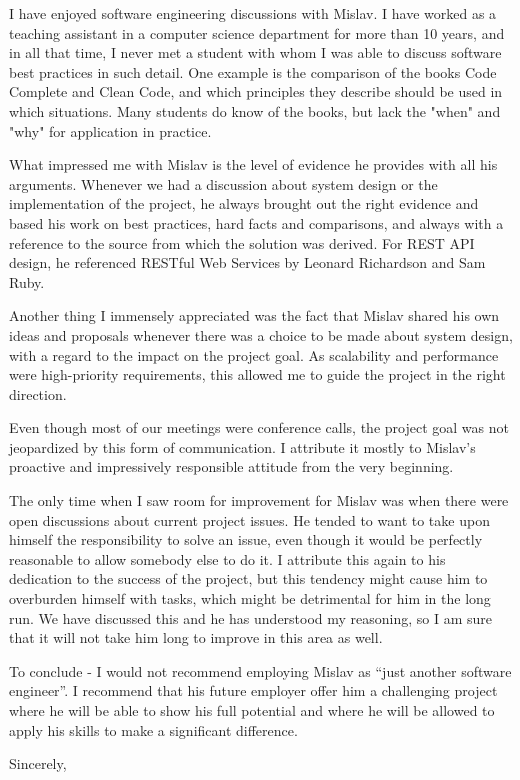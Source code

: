 \documentclass{letter}
\begin{document}
\begin{letter}{}
I have enjoyed software engineering discussions with Mislav. I have worked as a teaching assistant in a computer science department for more than 10 years, and in all that time, I never met a student with whom I was able to discuss software best practices in such detail. One example is the comparison of the books Code Complete and Clean Code, and which principles they describe should be used in which situations. Many students do know of the books, but lack the "when" and "why" for application in practice.

What impressed me with Mislav is the level of evidence he provides with all his arguments. Whenever we had a discussion about system design or the implementation of the project, he always brought out the right evidence and based his work on best practices, hard facts and comparisons, and always with a reference to the source from which the solution was derived. For REST API design, he referenced RESTful Web Services by Leonard Richardson and Sam Ruby.

Another thing I immensely appreciated was the fact that Mislav shared his own ideas and proposals whenever there was a choice to be made about system design, with a regard to the impact on the project goal. As scalability and performance were high-priority requirements, this allowed me to guide the project in the right direction.

Even though most of our meetings were conference calls, the project goal was not jeopardized by this form of communication. I attribute it mostly to Mislav’s proactive and impressively responsible attitude from the very beginning.

The only time when I saw room for improvement for Mislav was when there were open discussions about current project issues. He tended to want to take upon himself the responsibility to solve an issue, even though it would be perfectly reasonable to allow somebody else to do it. I attribute this again to his dedication to the success of the project, but this tendency might cause him to overburden himself with tasks, which might be detrimental for him in the long run. We have discussed this and he has understood my reasoning, so I am sure that it will not take him long to improve in this area as well.

To conclude - I would not recommend employing Mislav as “just another software engineer”. I recommend that his future employer offer him a challenging project where he will be able to show his full potential and where he will be allowed to apply his skills to make a significant difference.

\closing{Sincerely,}

\end{letter}
\end{document}
